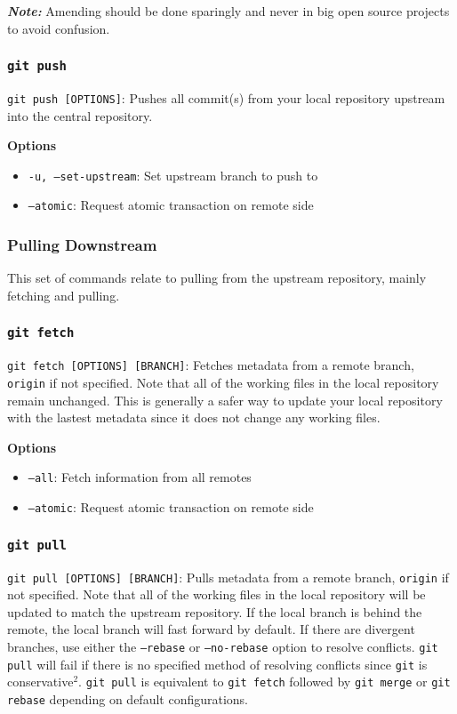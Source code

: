 \documentclass[13pt]{article}
\begin{document}
\textit{\textbf{Note:}} Amending should be done sparingly and never in big open source projects to avoid confusion.

\subsubsection*{\texttt{git push}}
\texttt{git push [OPTIONS]}: Pushes all commit(s) from your local repository upstream into the central repository.

\textbf{Options}
\begin{itemize}[label=]
\item \texttt{-u, --set-upstream}: Set upstream branch to push to
\item \texttt{--atomic}: Request atomic transaction on remote side
\end{itemize}

\subsubsection{Pulling Downstream}
This set of commands relate to pulling from the upstream repository, mainly fetching and pulling.

\subsubsection*{\texttt{git fetch}}
\texttt{git fetch [OPTIONS] [BRANCH]}: Fetches metadata from a remote branch, \texttt{origin} if not specified. Note that all of the working files in the local repository remain unchanged. This is generally a safer way to update your local repository with the lastest metadata since it does not change any working files.

\textbf{Options}
\begin{itemize}[label=]
\item \texttt{--all}: Fetch information from all remotes
\item \texttt{--atomic}: Request atomic transaction on remote side
\end{itemize}

\subsubsection*{\texttt{git pull}}
\texttt{git pull [OPTIONS] [BRANCH]}: Pulls metadata from a remote branch, \texttt{origin} if not specified. Note that all of the working files in the local repository will be updated to match the upstream repository. If the local branch is behind the remote, the local branch will fast forward by default. If there are divergent branches, use either the \texttt{--rebase} or \texttt{--no-rebase} option to resolve conflicts. \texttt{git pull} will fail if there is no specified method of resolving conflicts since \texttt{git} is conservative$^2$. \texttt{git pull} is equivalent to \texttt{git fetch} followed by \texttt{git merge} or \texttt{git rebase} depending on default configurations.
\end{document}
